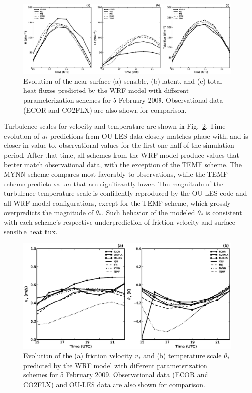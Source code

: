 \begin{figure}[ht!]
\begin{center}
\includegraphics[width=\textwidth]{figures/chapter4/shf_lhf_phys_20090205}
\end{center}
\caption{Evolution of the near-surface (a) sensible, (b) latent, and (c) total heat fluxes predicted by the WRF model with different parameterization schemes for 5 February 2009. Observational data (ECOR and CO2FLX) are also shown for comparison.}
\label{figure431}
\end{figure}


Turbulence scales for velocity and temperature are shown in Fig.~\ref{figure432}. Time evolution of $u_*$ predictions from OU-LES data closely matches phase with, and is closer in value to, observational values for the first one-half of the simulation period. After that time, all schemes from the WRF model produce values that better match observational data, with the exception of the TEMF scheme. The MYNN scheme compares most favorably to observations, while the TEMF scheme predicts values that are significantly lower. The magnitude of the turbulence temperature scale is confidently reproduced by the OU-LES code and all WRF model configurations, except for the TEMF scheme, which grossly overpredicts the magnitude of $\theta_*$. Such behavior of the modeled $\theta_*$ is consistent with each scheme's respective underprediction of friction velocity and surface sensible heat flux.


\begin{figure}[ht!]
\begin{center}
\includegraphics[width=\textwidth]{figures/chapter4/ust_tst_phys_20090205}
\end{center}
\caption{Evolution of the (a) friction velocity $u_*$ and (b) temperature scale $\theta_*$ predicted by the WRF model with different parameterization schemes for 5 February 2009. Observational data (ECOR and CO2FLX) and OU-LES data are also shown for comparison.}
\label{figure432}
\end{figure}


